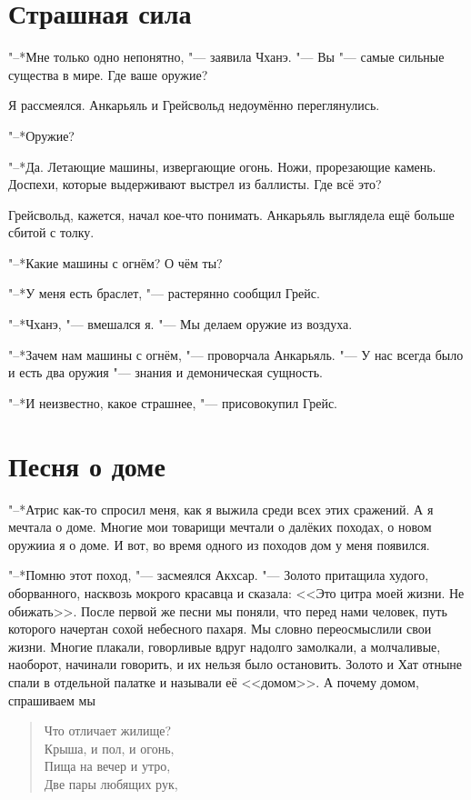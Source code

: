 \section{Страшная сила}

"--*Мне только одно непонятно, "--- заявила Чханэ.
"--- Вы "--- самые сильные существа в мире.
Где ваше оружие?

Я рассмеялся.
Анкарьяль и Грейсвольд недоумённо переглянулись.

"--*Оружие?

"--*Да.
Летающие машины, извергающие огонь.
Ножи, прорезающие камень.
Доспехи, которые выдерживают выстрел из баллисты.
Где всё это?

Грейсвольд, кажется, начал кое-что понимать.
Анкарьяль выглядела ещё больше сбитой с толку.

"--*Какие машины с огнём?
О чём ты?

"--*У меня есть браслет, "--- растерянно сообщил Грейс.

"--*Чханэ, "--- вмешался я.
"--- Мы делаем оружие из воздуха.

"--*Зачем нам машины с огнём, "--- проворчала Анкарьяль.
"--- У нас всегда было и есть два оружия "--- знания и демоническая сущность.

"--*И неизвестно, какое страшнее, "--- присовокупил Грейс.

\section{Песня о доме}

"--*Атрис как-то спросил меня, как я выжила среди всех этих сражений.
А я мечтала о доме.
Многие мои товарищи мечтали о далёких походах, о новом оружии\ldotst а я о доме.
И вот, во время одного из походов дом у меня появился.

"--*Помню этот поход, "--- засмеялся Акхсар.
"--- Золото притащила худого, оборванного, насквозь мокрого красавца и сказала: <<Это цитра моей жизни.
Не обижать>>.
После первой же песни мы поняли, что перед нами человек, путь которого начертан сохой небесного пахаря.
Мы словно переосмыслили свои жизни.
Многие плакали, говорливые вдруг надолго замолкали, а молчаливые, наоборот, начинали говорить, и их нельзя было остановить.
Золото и Хат отныне спали в отдельной палатке и называли её <<домом>>.
А почему домом, спрашиваем мы\ldotsq

\begin{verse}
Что отличает жилище?\\
Крыша, и пол, и огонь,\\
Пища на вечер и утро,\\
Две пары любящих рук,
\end{verse}

